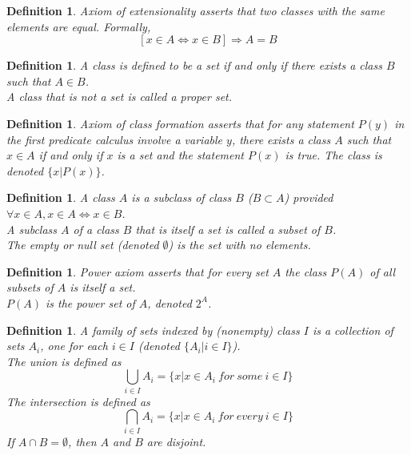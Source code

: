 \documentclass[a4paper,8pt]{article}
\newcommand{\hlt}[1]{\textit{{\color{blue}#1}}}
\theoremstyle{theorem}
\newtheorem{definition}[theorem]{Definition}
\begin{document}
\begin{definition}
\hlt{Axiom of extensionality} asserts that two classes with the same elements are equal. Formally, 
\begin{equation}
\left[x \in A \Longleftrightarrow x \in B \right] \Rightarrow A=B \nonumber
\end{equation}
\end{definition}

\begin{definition}
A class is defined to be a \hlt{set} if and only if there exists a class $ B $ such that $ A \in B $.\\
A class that is not a set is called a \hlt{proper set}.\\
\end{definition}

\begin{definition}
\hlt{Axiom of class formation} asserts that for any statement $ P(y) $ in the first predicate calculus involve a variable $ y $, there exists a class $ A $ such that $ x \in A $ if and only if $ x $ is a set and the statement $ P(x) $ is true. The class is denoted 	$\{ x | P(x) \}$.\\
\end{definition}

\begin{definition}
A class $ A $ is a \hlt{subclass} of class $ B $ ($ B \subset A $) provided $ \forall x \in A, x \in A \Longleftrightarrow x \in B $. \\
A subclass $ A $ of a class $ B $ that is itself a set is called a \hlt{subset} of $ B $.\\
The \hlt{empty or null set} (denoted $\emptyset$) is the set with no elements.\\
\end{definition}

\begin{definition}
\hlt{Power axiom} asserts that for every set $ A $ the class $ P(A) $ of all subsets of $ A $ is itself a set.\\
$ P(A) $ is the \hlt{power set} of $ A $, denoted $ 2^A $.\\
\end{definition}


\begin{definition}
A \hlt{family of sets} indexed by (nonempty) class $ I $ is a collection of sets $ A_i $, one for each $ i \in I $ (denoted $\{ A_i | i \in I \}$).\\
The \hlt{union} is defined as 
\begin{equation}
\bigcup\limits_{i \in I}A_{i} = \{ x | x \in A_i \ for \ some \ i \in I \} \nonumber
\end{equation}
The \hlt{intersection} is defined as 
\begin{equation}
\bigcap\limits_{i \in I}A_{i} = \{ x | x \in A_i \ for \ every \ i \in I \} \nonumber
\end{equation}
If $ A \cap B = \emptyset $, then $ A $ and $ B $ are disjoint.\\
\end{definition}
\end{document}
